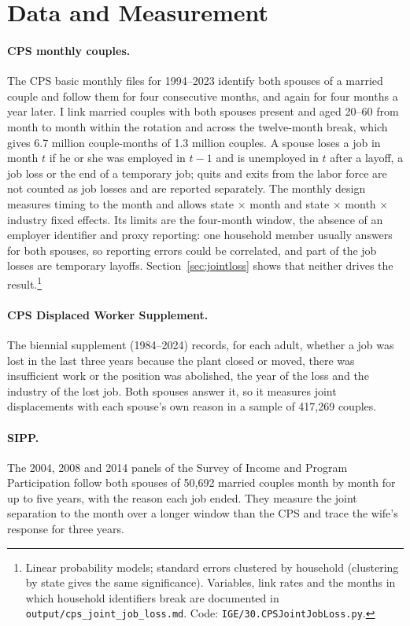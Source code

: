 \section{Data and Measurement}\label{sec:data}

\paragraph{CPS monthly couples.} The CPS basic monthly files for 1994--2023 identify both spouses of a married couple
and follow them for four consecutive months, and again for four months a year later. I link married couples with both
spouses present and aged 20--60 from month to month within the rotation and across the twelve-month break, which gives
6.7 million couple-months of 1.3 million couples. A spouse loses a job in month $t$ if he or she was employed in $t-1$
and is unemployed in $t$ after a layoff, a job loss or the end of a temporary job; quits and exits from the labor force
are not counted as job losses and are reported separately. The monthly design measures timing to the month and allows
state $\times$ month and state $\times$ month $\times$ industry fixed effects. Its limits are the four-month window, the
absence of an employer identifier and proxy reporting: one household member usually answers for both spouses, so
reporting errors could be correlated, and part of the job losses are temporary layoffs. Section~\ref{sec:jointloss}
shows that neither drives the result.\footnote{Linear probability models; standard errors clustered by household (clustering by state
gives the same significance). Variables, link rates and the months in which household identifiers break are documented
in \texttt{output/cps\_joint\_job\_loss.md}. Code: \texttt{IGE/30.CPSJointJobLoss.py}.}

\paragraph{CPS Displaced Worker Supplement.} The biennial supplement (1984--2024) records, for each adult, whether a job
was lost in the last three years because the plant closed or moved, there was insufficient work or the position was
abolished, the year of the loss and the industry of the lost job. Both spouses answer it, so it measures joint
displacements with each spouse's own reason in a sample of 417,269 couples.

\paragraph{SIPP.} The 2004, 2008 and 2014 panels of the Survey of Income and Program Participation follow both
spouses of 50,692 married couples month by month for up to five years, with the reason each job ended. They measure the
joint separation to the month over a longer window than the CPS and trace the wife's response for three years.

